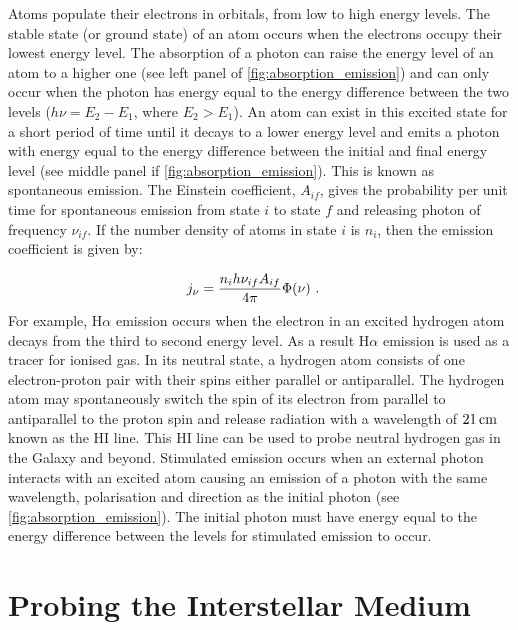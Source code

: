 Atoms populate their electrons in orbitals, from low to high energy levels. The stable state (or ground state) of an atom occurs when the electrons occupy their lowest energy level. The absorption of a photon can raise the energy level of an atom to a higher one (see left panel of \autoref{fig:absorption_emission}) and can only occur when the photon has energy equal to the energy difference between the two levels ($h\nu=E_2-E_1$, where $E_2>E_1$). An atom can exist in this excited state for a short period of time until it decays to a lower energy level and emits a photon with energy equal to the energy difference between the initial and final energy level (see middle panel if \autoref{fig:absorption_emission}). This is known as spontaneous emission. The Einstein coefficient, $A_{if}$, gives the probability per unit time for spontaneous emission from state $i$ to state $f$ and releasing photon of frequency $\nu_{if}$. If the number density of atoms in state $i$ is $n_i$, then the emission coefficient is given by:

\begin{equation}
	\begin{aligned}
		j_\nu&=\frac{n_ih\nu_{if}A_{if}}{4\pi}\Phi\qty(\nu)\text{ .}
	\end{aligned} \label{eq:interstellar_medium_emission_coefficient}
\end{equation}
\noindent For example, H$\alpha$ emission occurs when the electron in an excited hydrogen atom decays from the third to second energy level. As a result H$\alpha$ emission is used as a tracer for ionised gas. In its neutral state, a hydrogen atom consists of one electron-proton pair with their spins either parallel or antiparallel. The hydrogen atom may spontaneously switch the spin of its electron from parallel to antiparallel to the proton spin and release radiation with a wavelength of $21\,\si{\centi\meter}$ known as the HI line. This HI line can be used to probe neutral hydrogen gas in the Galaxy and beyond.
\newpar
Stimulated emission occurs when an external photon interacts with an excited atom causing an emission of a photon with the same wavelength, polarisation and direction as the initial photon (see \autoref{fig:absorption_emission}). The initial photon must have energy equal to the energy difference between the levels for stimulated emission to occur.

\section{Probing the Interstellar Medium} 

